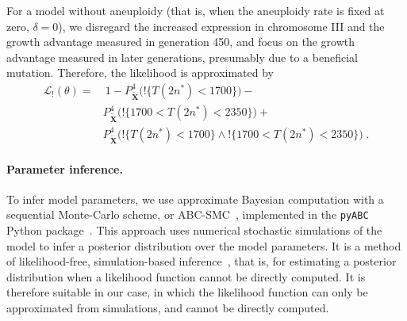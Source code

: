 \documentclass[12pt]{extarticle}
\let\vec\mathbf
\newcommand{\likelihood}{\mathcal{L}}
\begin{document}
For a model without aneuploidy (that is, when the aneuploidy rate is fixed at zero, $\delta=0$), we disregard the increased expression in chromosome III and the growth advantage measured in generation 450, and focus on the growth advantage measured in later generations, presumably due to a beneficial mutation. 
Therefore, the likelihood is approximated by
\begin{equation}\begin{aligned}
\label{eq:heatstress-noaneuploidy-likelihood}
\likelihood_{!}(\theta) = &\ 
	1 - 
	P_{\tilde{\vec X}}^4\big(!\{T(2n^*)<1700\}\big) - \\
&	P_{\tilde{\vec X}}^4\big(!\{1700 < T(2n^*) < 2350\}\big) + \\
&	P_{\tilde{\vec X}}^4\big(!\{T(2n^*)<1700\} \land !\{1700 < T(2n^*) < 2350\}\big)
\;.
\end{aligned}\end{equation}

\paragraph{Parameter inference.} To infer model parameters, we use approximate Bayesian computation with a sequential Monte-Carlo scheme, or ABC-SMC~\citep{Sisson2009}, implemented in the \texttt{pyABC} Python package~\citep[\href{https://pyabc.readthedocs.io}{pyabc.readthedocs.io}]{Klinger2018}.
This approach uses numerical stochastic simulations of the model to infer a posterior distribution over the model parameters. It is a method of likelihood-free, simulation-based inference~\citep{Cranmer2020}, that is, for estimating a posterior distribution when a likelihood function cannot be directly computed. It is therefore suitable in our case, in which the likelihood function can only be approximated from simulations, and cannot be directly computed. 
\end{document}
